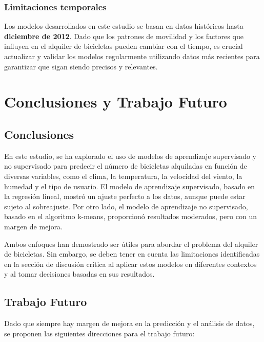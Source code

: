 \documentclass{wsdcr}
\begin{document}
\subsubsection{Limitaciones temporales}

Los modelos desarrollados en este estudio se basan en datos históricos hasta \textbf{diciembre de 2012}. Dado que los patrones de movilidad y los factores que influyen en el alquiler de bicicletas pueden cambiar con el tiempo, es crucial actualizar y validar los modelos regularmente utilizando datos más recientes para garantizar que sigan siendo precisos y relevantes.

\section{Conclusiones y Trabajo Futuro}

\subsection{Conclusiones}

En este estudio, se ha explorado el uso de modelos de aprendizaje supervisado y no supervisado para predecir el número de bicicletas alquiladas en función de diversas variables, como el clima, la temperatura, la velocidad del viento, la humedad y el tipo de usuario. El modelo de aprendizaje supervisado, basado en la regresión lineal, mostró un ajuste perfecto a los datos, aunque puede estar sujeto al sobreajuste. Por otro lado, el modelo de aprendizaje no supervisado, basado en el algoritmo k-means, proporcionó resultados moderados, pero con un margen de mejora.

Ambos enfoques han demostrado ser útiles para abordar el problema del alquiler de bicicletas. Sin embargo, se deben tener en cuenta las limitaciones identificadas en la sección de discusión crítica al aplicar estos modelos en diferentes contextos y al tomar decisiones basadas en sus resultados.

\subsection{Trabajo Futuro}

Dado que siempre hay margen de mejora en la predicción y el análisis de datos, se proponen las siguientes direcciones para el trabajo futuro:
\end{document}
